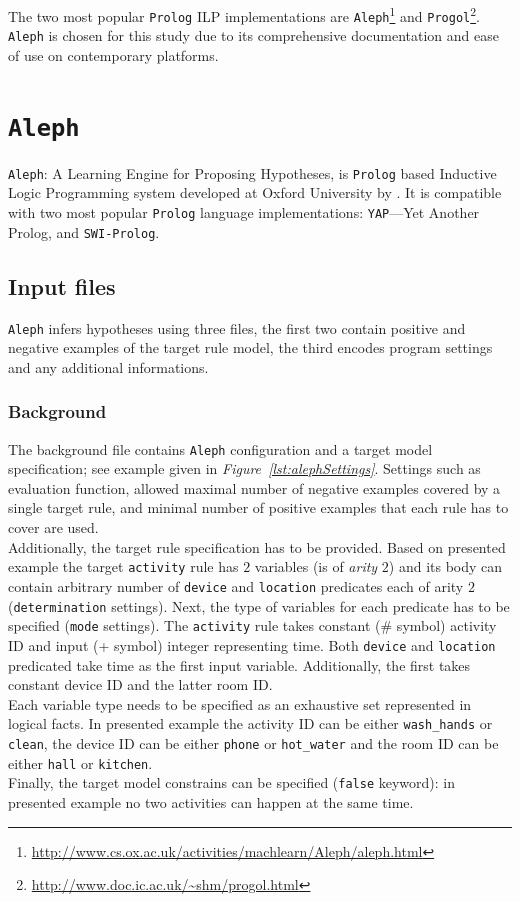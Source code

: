 \documentclass[10pt, a4paper, pdflatex, leqno, twoside, openright]{report}
\begin{document}
The two most popular \texttt{Prolog} ILP implementations are \texttt{Aleph}\footnote{\url{http://www.cs.ox.ac.uk/activities/machlearn/Aleph/aleph.html}} and \texttt{Progol}\footnote{\url{http://www.doc.ic.ac.uk/~shm/progol.html}}. \texttt{Aleph} is chosen for this study due to its comprehensive documentation and ease of use on contemporary platforms.

  \section{\texttt{Aleph}}
\texttt{Aleph}: A Learning Engine for Proposing Hypotheses, is \texttt{Prolog} based Inductive Logic Programming system developed at Oxford University by \citeauthor{muggleton1994inductive}. It is compatible with two most popular \texttt{Prolog} language implementations: \texttt{YAP}---Yet Another Prolog, and \texttt{SWI-Prolog}.

    \subsection{Input files}
\texttt{Aleph} infers hypotheses using three files, the first two contain positive and negative examples of the target rule model, the third encodes program settings and any additional informations.

      \subsubsection{Background}
The background file contains \texttt{Aleph} configuration and a target model specification; see example given in \emph{Figure~\ref{lst:alephSettings}}. Settings such as evaluation function, allowed maximal number of negative examples covered by a single target rule, and minimal number of positive examples that each rule has to cover are used.\\
Additionally, the target rule specification has to be provided. Based on presented example the target \texttt{activity} rule has $2$ variables (is of \emph{arity} $2$) and its body can contain arbitrary number of \texttt{device} and \texttt{location} predicates each of arity $2$ (\texttt{determination} settings). Next, the type of variables for each predicate has to be specified (\texttt{mode} settings). The \texttt{activity} rule takes constant (\# symbol) activity ID and input (+ symbol) integer representing time. Both \texttt{device} and \texttt{location} predicated take time as the first input variable. Additionally, the first takes constant device ID and the latter room ID.\\
Each variable type needs to be specified as an exhaustive set represented in logical facts. In presented example the activity ID can be either \texttt{wash\_hands} or \texttt{clean}, the device ID can be either \texttt{phone} or \texttt{hot\_water} and the room ID can be either \texttt{hall} or \texttt{kitchen}.\\
Finally, the target model constrains can be specified (\texttt{false} keyword): in presented example no two activities can happen at the same time.\\
\end{document}
